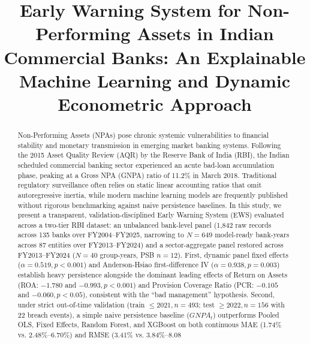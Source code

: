 \documentclass[conference]{IEEEtran}
\begin{document}
\title{Early Warning System for Non-Performing Assets in Indian Commercial Banks: An Explainable Machine Learning and Dynamic Econometric Approach}

\author{
}

\maketitle

\begin{abstract}
Non-Performing Assets (NPAs) pose chronic systemic vulnerabilities to financial stability and monetary transmission in emerging market banking systems. Following the 2015 Asset Quality Review (AQR) by the Reserve Bank of India (RBI), the Indian scheduled commercial banking sector experienced an acute bad-loan accumulation phase, peaking at a Gross NPA (GNPA) ratio of 11.2\% in March 2018. Traditional regulatory surveillance often relies on static linear accounting ratios that omit autoregressive inertia, while modern machine learning models are frequently published without rigorous benchmarking against naive persistence baselines. In this study, we present a transparent, validation-disciplined Early Warning System (EWS) evaluated across a two-tier RBI dataset: an unbalanced bank-level panel (1,842 raw records across 135 banks over FY2004--FY2025, narrowing to $N = 649$ model-ready bank-years across 87 entities over FY2013--FY2024) and a sector-aggregate panel restored across FY2013--FY2024 ($N = 40$ group-years, PSB $n = 12$). First, dynamic panel fixed effects ($\alpha = 0.519, p < 0.001$) and Anderson-Hsiao first-difference IV ($\alpha = 0.938, p = 0.003$) establish heavy persistence alongside the dominant leading effects of Return on Assets (ROA: $-1.780$ and $-0.993, p < 0.001$) and Provision Coverage Ratio (PCR: $-0.105$ and $-0.060, p < 0.05$), consistent with the ``bad management'' hypothesis. Second, under strict out-of-time validation (train $\le 2021, n = 493$; test $\ge 2022, n = 156$ with 22 breach events), a simple naive persistence baseline ($GNPA_t$) outperforms Pooled OLS, Fixed Effects, Random Forest, and XGBoost on both continuous MAE (1.74\% vs. 2.48\%--6.70\%) and RMSE (3.41\% vs. 3.84\%--8.08%

\end{abstract}
\end{document}
